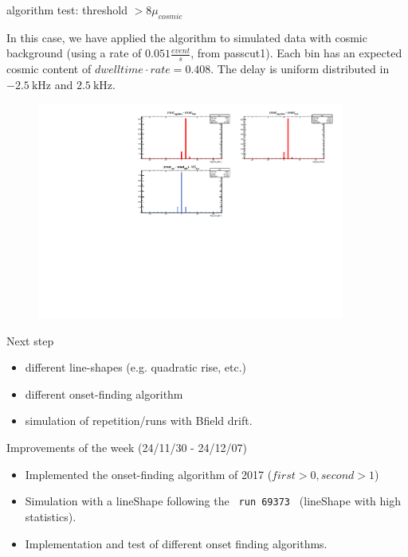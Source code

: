 \documentclass[9pt]{beamer}
\begin{document}
\begin{frame}{algorithm test: threshold $ > 8 \mu_{cosmic}$}

In this case, we have applied the algorithm to simulated data with cosmic background (using a rate of $0.051 \frac{event}{s}$, from passcut1). Each bin has an expected cosmic content of $dwelltime \cdot rate = 0.408$.
The delay is uniform distributed in $\SI{-2.5}{\kilo \hertz}$ and $\SI{+2.5}{\kilo \hertz}$. 
\begin{figure}
\includegraphics[width = 0.9\textwidth]{../Plot/OnsetResult15.pdf}
\end{figure}

\end{frame}

\begin{frame}{Next step}
\begin{itemize}
\item different line-shapes (e.g. quadratic rise, etc.)
\item different onset-finding algorithm
\item simulation of repetition/runs with Bfield drift.
\end{itemize}
\end{frame}

\begin{frame}{ Improvements of the week (24/11/30 - 24/12/07)}
\begin{itemize}
\item Implemented the onset-finding algorithm of 2017 ($first > 0 , second > 1$)
\item Simulation with a lineShape following the \texttt{ run 69373 } (lineShape with high statistics).
\item Implementation and test of different onset finding algorithms.
\end{itemize}
\end{frame}
\end{document}
